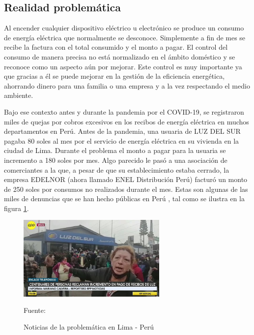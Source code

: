 \documentclass[a4paper, 12pt]{article}
\begin{document}
\subsection{Realidad problemática}
Al encender cualquier dispositivo eléctrico u electrónico se produce un consumo de energía eléctrica que normalmente se desconoce. Simplemente a fin de mes se recibe la factura con el total consumido y el monto a pagar. El control del consumo de manera precisa no está normalizado en el ámbito doméstico y se reconoce como un aspecto aún por mejorar. Este control es muy importante ya que gracias a él se puede mejorar en la gestión de la eficiencia energética, ahorrando dinero para una familia o una empresa y a la vez respectando el medio ambiente.

\vspace{0.25cm}

Bajo ese contexto antes y durante la pandemia por el COVID-19, se registraron miles de quejas por cobros excesivos en los recibos de energía eléctrica en muchos departamentos en Perú. Antes de la pandemia, una usuaria de LUZ DEL SUR \citep{WEBSITE:32} pagaba 80 soles al mes por el servicio de energía eléctrica en su vivienda en la ciudad de Lima. Durante el problema el monto a pagar para la usuaria se incremento a 180 soles por mes. Algo parecido le pasó a una asociación de comerciantes a la que, a pesar de que su establecimiento estaba cerrado, la empresa EDELNOR (ahora llamado ENEL Distribución Perú) \citep{WEBSITE:33} \citep{WEBSITE:34} facturó un monto de 250 soles por consumos no realizados durante el mes. Estas son algunas de las miles de denuncias que se han hecho públicas en Perú \citep{WEBSITE:1}, tal como se ilustra en la figura \ref{fig:motivacion}.

\vspace{0.5cm}

\begin{figure}[ht]
\begin{center}
\includegraphics[width=0.65\textwidth]{motivacion}
\end{center}
\begin{center}
\vskip -0.5cm
\caption{\small{Noticias de la problemática en Lima - Perú}}
\label{fig:motivacion}
{\small{Fuente: \citep{WEBSITE:35}}}
\end{center}
\end{figure}
\end{document}

